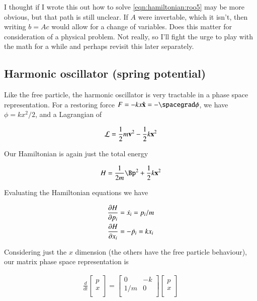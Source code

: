 I thought if I wrote this out how to solve \ref{eqn:hamiltonian:roo5} may be more obvious, but that path is still unclear.  If $A$ were invertable, which it isn't, then writing $b = A c$ would allow for a change of variables.  Does this matter for consideration of a physical problem.  Not really, so I'll fight the urge to play with the math for a while and perhaps revisit this later separately.

\subsection{Harmonic oscillator (spring potential)}

Like the free particle, the harmonic oscillator is very tractable in a phase space representation.  For a restoring force $F = - k x \xcap = -\spacegrad \phi$, we have $\phi = k x^2/2$, and a Lagrangian of

\begin{align}\label{eqn:hamiltonian:woo1}
\LL = \inv{2} m \Bv^2 - \inv{2} k \Bx^2
\end{align}

Our Hamiltonian is again just the total energy 

\begin{align}\label{eqn:hamiltonian:woo2}
H = \inv{2m} \Bp^2 + \inv{2} k \Bx^2
\end{align}

Evaluating the Hamiltonian equations we have

\begin{align}\label{eqn:hamiltonian:woo3}
\PD{p_i}{H} &= \dot{x_i} = p_i/m \\
\PD{x_i}{H} &= -\dot{p_i} = k x_i
\end{align}

Considering just the $x$ dimension (the others have the free particle behaviour), our matrix phase space representation is

\begin{align}\label{eqn:hamiltonian:woo4}
\frac{d}{dt}
\begin{bmatrix}
p \\
x \\
\end{bmatrix}
=
\begin{bmatrix}
0 & - k \\
1/m & 0 \\
\end{bmatrix}
\begin{bmatrix}
p \\
x \\
\end{bmatrix}
\end{align}

